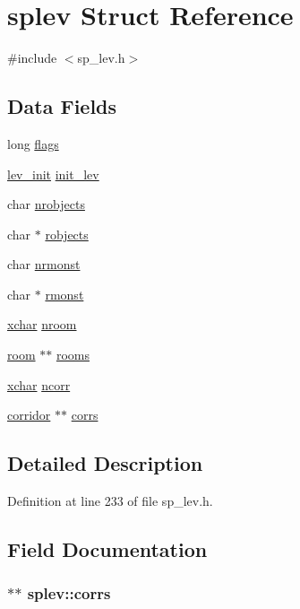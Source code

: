 \hypertarget{structsplev}{\section{splev Struct Reference}
\label{structsplev}
}


{\ttfamily \#include $<$sp\+\_\+lev.\+h$>$}

\subsection*{Data Fields}
\begin{DoxyCompactItemize}
\item 
long \hyperlink{structsplev_a4f7ba4188d5d296fd6ed959183af660c}{flags}
\item 
\hyperlink{structlev__init}{lev\+\_\+init} \hyperlink{structsplev_a97a8b75e38c352ba437bd9fa290f3ccd}{init\+\_\+lev}
\item 
char \hyperlink{structsplev_afc4267345f75bcea5f35eae876918c52}{nrobjects}
\item 
char $\ast$ \hyperlink{structsplev_a86a82c3d213c379a586bce1452744069}{robjects}
\item 
char \hyperlink{structsplev_a11a95089572de3a93c0bbfd541a204a2}{nrmonst}
\item 
char $\ast$ \hyperlink{structsplev_a42df052ed782bc58321bdead20ede49c}{rmonst}
\item 
\hyperlink{global_8h_a2043b7d01ce89f4ee2fa6c345a752d32}{xchar} \hyperlink{structsplev_a936751db31b42a6a4222b781c61e309c}{nroom}
\item 
\hyperlink{sp__lev_8h_a92a4ee12d286276ed17c9feda3bc4e42}{room} $\ast$$\ast$ \hyperlink{structsplev_a3a2d15990508c2ead07e23471b8eadcf}{rooms}
\item 
\hyperlink{global_8h_a2043b7d01ce89f4ee2fa6c345a752d32}{xchar} \hyperlink{structsplev_abffd053b9b292d9be01c0f3c37be3d25}{ncorr}
\item 
\hyperlink{structcorridor}{corridor} $\ast$$\ast$ \hyperlink{structsplev_a154f64a3b8133baca6e4cb23724973ca}{corrs}
\end{DoxyCompactItemize}


\subsection{Detailed Description}


Definition at line 233 of file sp\+\_\+lev.\+h.



\subsection{Field Documentation}
\hypertarget{structsplev_a154f64a3b8133baca6e4cb23724973ca}{
\subsubsection[{corrs}]{$\ast$$\ast$ splev\+::corrs}}\label{structsplev_a154f64a3b8133baca6e4cb23724973ca}


